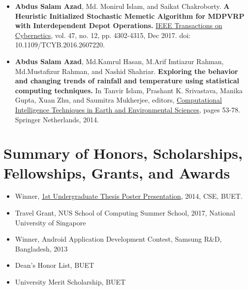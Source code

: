 \documentclass[12pt]{article}
\begin{document}
\begin{itemize}
	\item {\bf Abdus Salam Azad}, Md. Monirul Islam, and Saikat Chakroborty. 
	\textbf{A Heuristic Initialized Stochastic Memetic Algorithm for MDPVRP with Interdependent Depot Operations.} \href{http://ieeexplore.ieee.org/document/7835722/}{IEEE Transactions on Cybernetics}, vol. 47, no. 12, pp. 4302-4315, Dec 2017. doi: 10.1109/TCYB.2016.2607220.
	\item {\bf Abdus Salam Azad}, Md.Kamrul Hasan, M.Arif Imtiazur Rahman,
	Md.Mustafizur Rahman, and Nashid Shahriar. {\bf Exploring the behavior and changing trends of rainfall and temperature using statistical
		computing techniques.} In Tanvir Islam, Prashant K. Srivastava, Manika
	Gupta, Xuan Zhu, and Saumitra Mukherjee, editors, \href{https://link.springer.com/chapter/10.1007/978-94-017-8642-3_3}{Computational Intelligence Techniques in Earth and Environmental Sciences}, pages 53-78.
	Springer Netherlands, 2014.
\end{itemize}
 





 
{\centering\section*{Summary of Honors, Scholarships, Fellowships, Grants, and Awards}}

\begin{itemize}
	\item Winner, \href{http://cse.buet.ac.bd/news/news.php?newsid=93}{1st Undergraduate Thesis Poster Presentation}, 2014, CSE, BUET.
	\item Travel Grant, NUS School of Computing Summer School, 2017,  National University of Singapore
	\item Winner, Android Application Development Contest, Samsung R\&D, Bangladesh, 2013
	\item Dean's Honor List, BUET
	\item University Merit Scholarship, BUET
\end{itemize}
\end{document}
